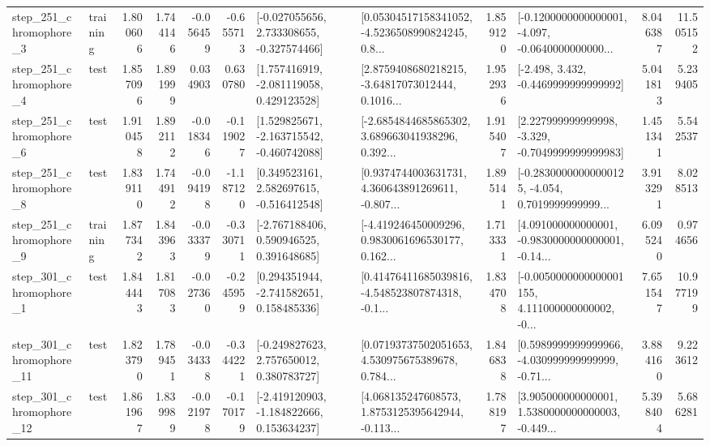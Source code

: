 \begin{tabular}{llrrrrllrlrr}
   step\_251\_chromophore\_3 &  training &      1.800606 &    1.744146 &     -0.056459 & -0.655713 &   [-0.027055656, 2.733308655, -0.327574466] &  [0.05304517158341052, -4.5236508990824245, 0.8... &       1.859120 &  [-0.1200000000000001, -4.097, -0.0640000000000... &            8.046387 &         11.505152 \\
   step\_251\_chromophore\_4 &      test &      1.857096 &    1.891999 &      0.034903 &  0.630780 &    [1.757416919, -2.081119058, 0.429123528] &  [2.8759408680218215, -3.64817073012444, 0.1016... &       1.952936 &               [-2.498, 3.432, -0.4469999999999992] &            5.041813 &          5.239405 \\
   step\_251\_chromophore\_6 &      test &      1.910458 &    1.892112 &     -0.018346 & -0.119027 &   [1.529825671, -2.163715542, -0.460742088] &  [-2.6854844685865302, 3.689663041938296, 0.392... &       1.915407 &   [2.227999999999998, -3.329, -0.7049999999999983] &            1.451341 &          5.542537 \\
   step\_251\_chromophore\_8 &      test &      1.839110 &    1.744912 &     -0.094198 & -1.187120 &    [0.349523161, 2.582697615, -0.516412548] &  [0.9374744003631731, 4.360643891269611, -0.807... &       1.895141 &  [-0.28300000000000125, -4.054, 0.7019999999999... &            3.913291 &          8.028513 \\
   step\_251\_chromophore\_9 &  training &      1.877342 &    1.843963 &     -0.033379 & -0.330711 &    [-2.767188406, 0.590946525, 0.391648685] &  [-4.419246450009296, 0.9830061696530177, 0.162... &       1.713331 &  [4.091000000000001, -0.9830000000000001, -0.14... &            6.095240 &          0.974656 \\
   step\_301\_chromophore\_1 &      test &      1.844443 &    1.817083 &     -0.027360 & -0.245959 &    [0.294351944, -2.741582651, 0.158485336] &  [0.41476411685039816, -4.548523807874318, -0.1... &       1.834708 &  [-0.0050000000000001155, 4.111000000000002, -0... &            7.651547 &         10.977199 \\
  step\_301\_chromophore\_11 &      test &      1.823790 &    1.789451 &     -0.034338 & -0.344221 &    [-0.249827623, 2.757650012, 0.380783727] &  [0.07193737502051653, 4.530975675389678, 0.784... &       1.846838 &  [0.5989999999999966, -4.030999999999999, -0.71... &            3.884160 &          9.223612 \\
  step\_301\_chromophore\_12 &      test &      1.861967 &    1.839989 &     -0.021978 & -0.170179 &   [-2.419120903, -1.184822666, 0.153634237] &  [4.068135247608573, 1.8753125395642944, -0.113... &       1.788197 &  [3.905000000000001, 1.5380000000000003, -0.449... &            5.398404 &          5.686281 \\

\end{tabular}
